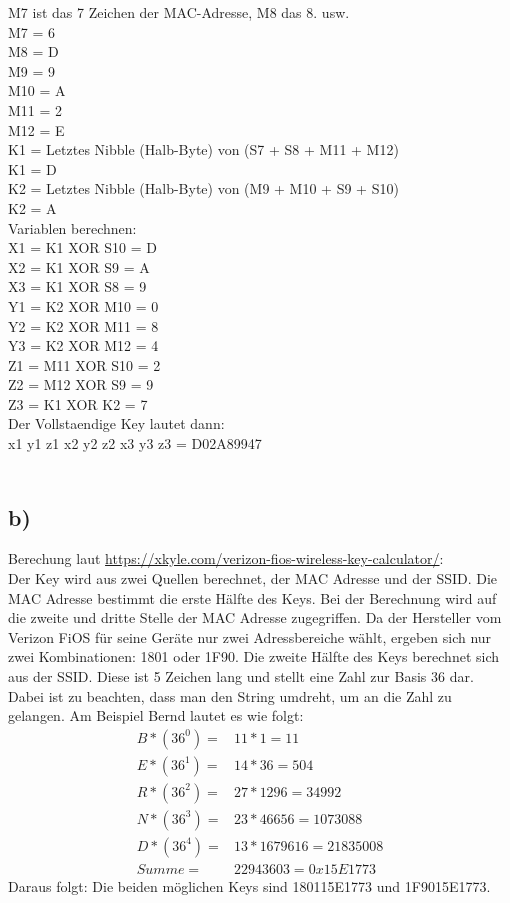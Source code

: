 \documentclass[10pt,a4paper]{article}
\begin{document}
M7 ist das 7 Zeichen der MAC-Adresse, M8 das 8. usw.\\
M7 =  6 \\
M8 =  D \\
M9 =  9 \\
M10 =  A \\
M11 =  2 \\
M12 =  E \\

K1 = Letztes Nibble (Halb-Byte) von (S7 + S8 + M11 + M12)\\
K1 =  D \\

K2 = Letztes Nibble (Halb-Byte) von (M9 + M10 + S9 + S10)\\
K2 =  A \\

Variablen berechnen:\\
X1 = K1  XOR S10 =  D \\
X2 = K1  XOR S9  =  A \\
X3 = K1  XOR S8  =  9 \\
Y1 = K2  XOR M10 =  0 \\
Y2 = K2  XOR M11 =  8 \\
Y3 = K2  XOR M12 =  4 \\
Z1 = M11 XOR S10 =  2 \\
Z2 = M12 XOR S9  =  9 \\
Z3 = K1  XOR K2  =  7 \\
 
Der Vollstaendige Key lautet dann:\\
x1 y1 z1 x2 y2 z2 x3 y3 z3 = D02A89947 \\\\


\subsection*{b)}
Berechung laut \href{https://xkyle.com/verizon-fios-wireless-key-calculator/}{https://xkyle.com/verizon-fios-wireless-key-calculator/}:\\
Der Key wird aus zwei Quellen berechnet, der MAC Adresse und der SSID. Die MAC Adresse bestimmt die erste Hälfte des Keys. Bei der Berechnung wird auf die zweite und dritte Stelle der MAC Adresse zugegriffen. Da der Hersteller vom Verizon FiOS für seine Geräte nur zwei Adressbereiche wählt, ergeben sich nur zwei Kombinationen: 1801 oder 1F90. 
Die zweite Hälfte des Keys berechnet sich aus der SSID. Diese ist 5 Zeichen lang und stellt eine Zahl zur Basis 36 dar. Dabei ist zu beachten, dass man den String umdreht, um an die Zahl zu gelangen.
Am Beispiel Bernd lautet es wie folgt:\\
\begin{align*}
B*(36^0) = &11 * 1 = 11\\
E*(36^1) = &14 * 36 = 504\\
R*(36^2) = &27 * 1296 = 34992\\
N*(36^3) = &23 * 46656 = 1073088\\
D*(36^4) = &13 * 1679616 = 21835008\\
Summe = &22943603 = 0x15E1773
\end{align*}
Daraus folgt: Die beiden möglichen Keys sind 180115E1773 und 1F9015E1773.
\end{document}
